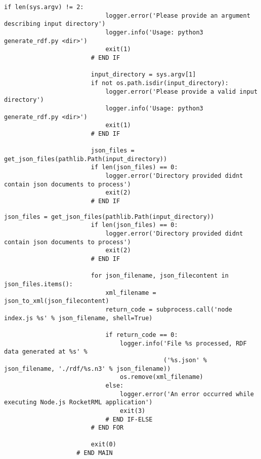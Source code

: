 \begin{minipage}{\linewidth}
\begin{lstlisting}[language=lPython]
                        if len(sys.argv) != 2:
                            logger.error('Please provide an argument describing input directory')
                            logger.info('Usage: python3 generate_rdf.py <dir>')
                            exit(1)
                        # END IF
                    
                        input_directory = sys.argv[1]
                        if not os.path.isdir(input_directory):
                            logger.error('Please provide a valid input directory')
                            logger.info('Usage: python3 generate_rdf.py <dir>')
                            exit(1)
                        # END IF
                        
                        json_files = get_json_files(pathlib.Path(input_directory))
                        if len(json_files) == 0:
                            logger.error('Directory provided didnt contain json documents to process')
                            exit(2)
                        # END IF
                \end{lstlisting}
            \end{minipage}
            \begin{minipage}{\linewidth}
                \begin{lstlisting}[language=lPython]
                        json_files = get_json_files(pathlib.Path(input_directory))
                        if len(json_files) == 0:
                            logger.error('Directory provided didnt contain json documents to process')
                            exit(2)
                        # END IF
                    
                        for json_filename, json_filecontent in json_files.items():
                            xml_filename = json_to_xml(json_filecontent)
                            return_code = subprocess.call('node index.js %s' % json_filename, shell=True)
                    
                            if return_code == 0:
                                logger.info('File %s processed, RDF data generated at %s' %
                                            ('%s.json' % json_filename, './rdf/%s.n3' % json_filename))
                                os.remove(xml_filename)
                            else:
                                logger.error('An error occurred while executing Node.js RocketRML application')
                                exit(3)
                            # END IF-ELSE
                        # END FOR
                        
                        exit(0)
                    # END MAIN
                \end{lstlisting}
            \end{minipage}
    
